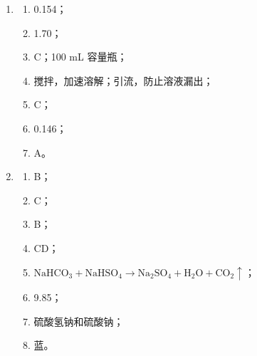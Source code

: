 \documentclass[11pt,a4paper]{article}
\begin{document}
\begin{enumerate}[label=\textbf{\arabic*.},leftmargin=2.5em]
\item
\begin{enumerate}[label=（\arabic*）]
\item 0.154；
\item 1.70；
\item C；100 mL 容量瓶；
\item 搅拌，加速溶解；引流，防止溶液漏出；
\item C；
\item 0.146；
\item A。
\end{enumerate}

\item
\begin{enumerate}[label=（\arabic*）]
\item B；
\item C；
\item B；
\item CD；
\item $\mathrm{NaHCO_3 + NaHSO_4 \longrightarrow Na_2SO_4 + H_2O + CO_2 \uparrow}$；
\item 9.85；
\item 硫酸氢钠和硫酸钠；
\item 蓝。
\end{enumerate}
\end{enumerate}
\fi
\end{document}
